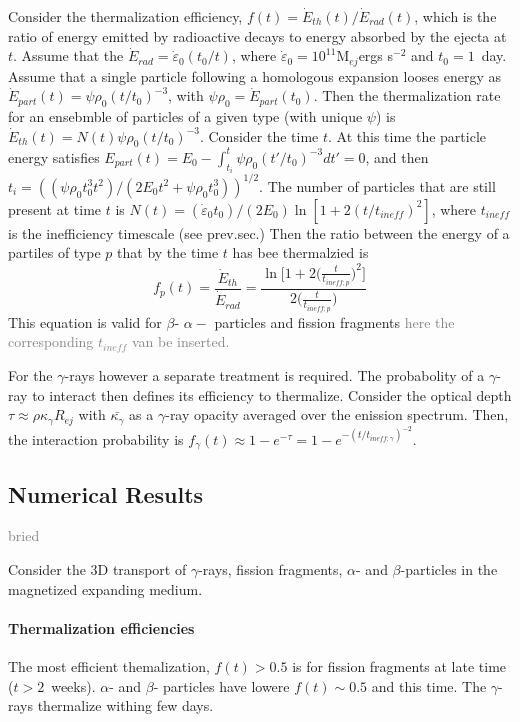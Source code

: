 \documentclass[11pt,a4paper,headinclude=true,DIV=14,BCOR=8mm,chapterprefix,listof=totoc,twoside,openright,abstracton]{scrbook}
\newcommand{\gray}[1]{\textcolor{gray}{#1}}
\begin{document}
Consider the thermalization efficiency, $f(t) = \dot{E}_{th}(t) / \dot{E}_{rad}(t)$, which is the ratio of energy emitted by radioactive decays to energy absorbed by the ejecta at $t$. 
Assume that the $\dot{E}_{rad} = \dot{\varepsilon}_0(t_0/t)$, where $\dot{\varepsilon}_0 = 10^{11}$M$_{ej}$ergs s$^{-2}$ and $t_0=1$~day. 
Assume that a single particle following a homologous expansion looses energy as $\dot{E}_{part}(t) = \psi \rho_0 (t/t_0)^{-3}$, with $\psi\rho_0=\dot{E}_{part}(t_0)$. 
Then the thermalization rate for an ensebmble of particles of a given type (with unique $\psi$) is $\dot{E}_{th}(t) = N(t) \psi \rho_0 (t/t_0)^{-3}$.
Consider the time $t$. At this time the particle energy satisfies $E_{part}(t)=E_0 - \int_{t_i}^{t}\psi\rho_0 (t'/t_0)^{-3}dt' = 0$, and then $t_i = ((\psi\rho_0 t_0^3 t^2)/(2E_0t^2 + \psi\rho_0 t_0^3))^{1/2}$. 
The number of particles that are still present at time $t$ is $N(t) = (\dot{\varepsilon}_0 t_0)/(2E_0) \ln[ 1+2(t/t_{ineff})^2 ]$, where $t_{ineff}$ is the inefficiency timescale (see prev.sec.)
Then the ratio between the energy of a partiles of type $p$ that by the time $t$ has bee thermalzied is 
\begin{equation}
    f_p(t) = \frac{\dot{E}_{th}}{\dot{E}_{rad}} = \frac{\ln\Bigg[1 + 2 \Big(\frac{t}{t_{ineff;p}}\Big)^2\Bigg]}{2\Big(\frac{t}{t_{ineff;p}}\Big)}
\end{equation}
This equation is valid for $\beta$- $\alpha-$ particles and fission fragments \gray{here the corresponding $t_{ineff}$ van be inserted.}

For the $\gamma$-rays however a separate treatment is required. The probabolity of a $\gamma$-ray to interact then defines its efficiency to thermalize. 
Consider the optical depth $\tau\approx\rho\kappa_{\gamma}R_{ej}$ with $\bar{\kappa_{\gamma}}$ as a $\gamma$-ray opacity averaged over the enission spectrum. Then, the interaction probability is $f_{\gamma}(t) \approx 1 - e^{-\tau} = 1-e^{-(t/t_{ineff;\gamma})^{-2}}$.


\subsection{Numerical Results}
\gray{bried}

Consider the 3D transport of $\gamma$-rays, fission fragments, $\alpha$- and $\beta$-particles in the magnetized expanding medium. 


\paragraph{Thermalization efficiencies} The most efficient themalization, $f(t)>0.5$ is for fission fragments at late time ($t>2$~weeks). $\alpha$- and $\beta$- particles have lowere $f(t)\sim0.5$ and this time. The $\gamma$-rays thermalize withing few days. 
\end{document}
